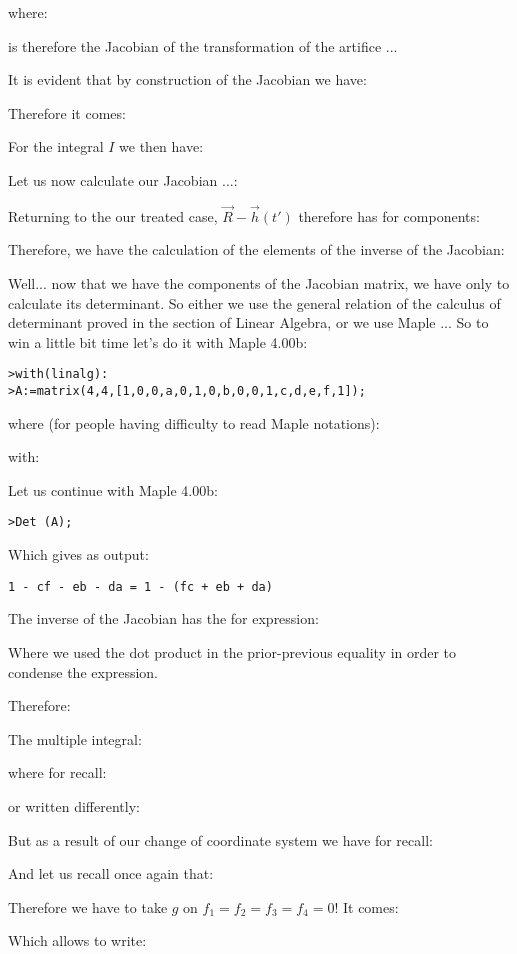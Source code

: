 	where:
	
	is therefore the Jacobian of the transformation of the artifice ...

	It is evident that by construction of the Jacobian we have:
	
	Therefore it comes:
	
	For the integral $I$ we then have:
	
	Let us now calculate our Jacobian ...:
	
	Returning to the our treated case, $\vec{R}-\vec{h}(t')$ therefore has for components:
	
	Therefore, we have the calculation of the elements of the inverse of the Jacobian:
	
	Well... now that we have the components of the Jacobian matrix, we have only to calculate its determinant. So either we use the general relation of the calculus of determinant proved in the section of Linear Algebra, or we use Maple ... So to win a little bit time let's do it with Maple 4.00b:
	
	\texttt{>with(linalg):\\
	>A:=matrix(4,4,[1,0,0,a,0,1,0,b,0,0,1,c,d,e,f,1]);}
	
	where (for people having difficulty to read Maple notations):
	
	with:
	
	Let us continue with Maple 4.00b:

	\texttt{>Det (A);}
	
	Which gives as output:

	\begin{center}
		\texttt{1 - cf - eb - da = 1 - (fc + eb + da)}
	\end{center}
	The inverse of the Jacobian has the for expression:
	
	Where we used the dot product in the prior-previous equality in order to condense the expression.

	Therefore:
	
	The multiple integral:
	
	where for recall:
	
	or written differently:
	
	But as a result of our change of coordinate system we have for recall:	
	
	And let us recall once again that:
		
	Therefore we have to take $g$ on $f_1=f_2=f_3=f_4=0$! It comes:
	
	Which allows to write:
	
